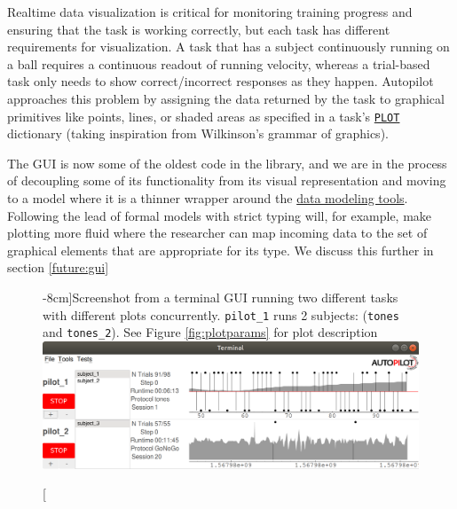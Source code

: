 Realtime data visualization is critical for monitoring training progress and ensuring that the task is working correctly, but each task has different requirements for visualization. A task that has a subject continuously running on a ball requires a continuous readout of running velocity, whereas a trial-based task only needs to show correct/incorrect responses as they happen. Autopilot approaches this problem by assigning the data returned by the task to graphical primitives like points, lines, or shaded areas as specified in a task's \hyperref[sec:taskcomponents]{\texttt{PLOT}} dictionary (taking inspiration from Wilkinson's grammar of graphics\citep{wilkinsonGrammarGraphics2012}).

The GUI is now some of the oldest code in the library, and we are in the process of decoupling some of its functionality from its visual representation and moving to a model where it is a thinner wrapper around the \hyperref[sec:data]{data modeling tools}. Following the lead of formal models with strict typing will, for example, make plotting more fluid where the researcher can map incoming data to the set of graphical elements that are appropriate for its type. We discuss this further in section \ref{future:gui}

\begin{figure}[hb!]
\caption[][-8cm]{Screenshot from a terminal GUI running two different tasks with different plots concurrently. \texttt{pilot\_1} runs 2 subjects: (\texttt{tones} and \texttt{tones\_2}). See Figure \ref{fig:plotparams} for plot description}
\label{fig:gui}
\includegraphics[]{figures/ss_3_nocrop.png}
\end{figure}%

